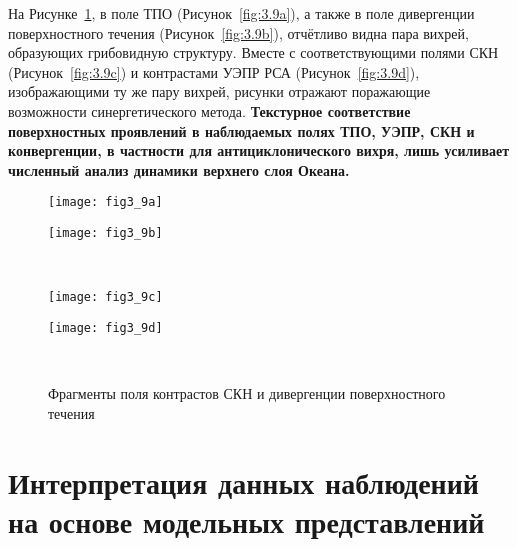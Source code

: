{На Рисунке~\ref{fig:3.9}, в поле ТПО (Рисунок~\ref{fig:3.9a}), а также в поле дивергенции поверхностного течения (Рисунок~\ref{fig:3.9b}), отчётливо видна пара вихрей, образующих грибовидную структуру. Вместе с соответствующими полями СКН (Рисунок~\ref{fig:3.9c}) и контрастами УЭПР РСА (Рисунок~\ref{fig:3.9d}), изображающими ту же пару вихрей, рисунки отражают поражающие возможности синергетического метода. \textbf{Текстурное соответствие поверхностных проявлений в наблюдаемых полях ТПО, УЭПР, СКН и конвергенции, в частности для антициклонического вихря, лишь усиливает численный анализ динамики верхнего слоя Океана.}



\begin{figure}[H]
   	\centering
	\begin{minipage}{.47\textwidth}
	    \subcaptionbox{\label{fig:3.9a}}
		{\texttt{[image: fig3\_9a]}}
	\end{minipage}
	\hfill
	\begin{minipage}{.47\textwidth}
	    \subcaptionbox{\label{fig:3.9b}}
		{\texttt{[image: fig3\_9b]}}
	\end{minipage}
	\\
	\begin{minipage}{.47\textwidth}
	    \subcaptionbox{\label{fig:3.9c}}
		{\texttt{[image: fig3\_9c]}}
	\end{minipage}
	\hfill
	\begin{minipage}{.47\textwidth}
	    \subcaptionbox{\label{fig:3.9d}}
		{\texttt{[image: fig3\_9d]}}
	\end{minipage}
    \\
    \caption{Фрагменты поля контрастов СКН и дивергенции поверхностного течения}
    \label{fig:3.9}
\end{figure}



\section{Интерпретация данных наблюдений на основе модельных представлений} \label{sec:3.3}


}
